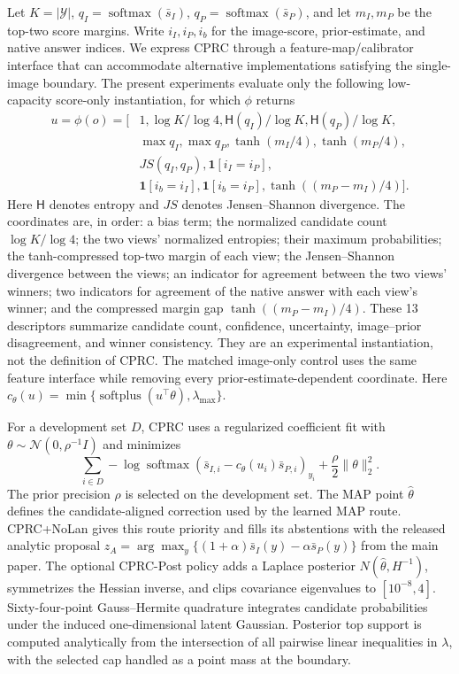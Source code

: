 \documentclass[letterpaper]{article}
\begin{document}
Let $K=|\mathcal Y|$, $q_I=\operatorname{softmax}(\bar s_I)$,
$q_P=\operatorname{softmax}(\bar s_P)$, and let $m_I,m_P$ be the top-two score
margins. Write $i_I,i_P,i_b$ for the image-score, prior-estimate, and native
answer indices. We express CPRC through a feature-map/calibrator interface that
can accommodate alternative implementations satisfying the single-image
boundary. The present experiments evaluate only the following low-capacity
score-only instantiation, for which $\phi$ returns
\begin{align}
u=\phi(o)=[&1,\log K/\log4,\mathsf H(q_I)/\log K,\mathsf H(q_P)/\log K,\nonumber\\
&\max q_I,\max q_P,\tanh(m_I/4),\tanh(m_P/4),\nonumber\\
&JS(q_I,q_P),\mathbf1[i_I=i_P],\nonumber\\
&\mathbf1[i_b=i_I],\mathbf1[i_b=i_P],
\tanh((m_P-m_I)/4)].
\end{align}
Here $\mathsf H$ denotes entropy and $JS$ denotes Jensen--Shannon divergence.
The coordinates are, in order: a bias term; the normalized candidate count
$\log K/\log 4$; the two views' normalized entropies; their maximum
probabilities; the tanh-compressed top-two margin of each view; the
Jensen--Shannon divergence between the views; an indicator for agreement
between the two views' winners; two indicators for agreement of the native
answer with each view's winner; and the compressed margin gap
$\tanh((m_P-m_I)/4)$. These 13 descriptors summarize candidate count, confidence, uncertainty,
image--prior disagreement, and winner consistency. They are an experimental
instantiation, not the definition of CPRC. The matched image-only control uses
the same feature interface while removing every prior-estimate-dependent coordinate.
Here
$c_\theta(u)=\min\{\operatorname{softplus}(u^\top\theta),\lambda_{\max}\}$.

For a development set $D$, CPRC uses a regularized coefficient fit with
$\theta\sim\mathcal N(0,\rho^{-1}I)$ and minimizes
\begin{equation}
\sum_{i\in D}-\log\operatorname{softmax}
  (\bar s_{I,i}-c_\theta(u_i)\bar s_{P,i})_{y_i}
  +\frac{\rho}{2}\|\theta\|_2^2.
\end{equation}
The prior precision $\rho$ is selected on the development set. The MAP point
$\hat\theta$ defines the candidate-aligned correction used by the learned MAP
route. CPRC+NoLan gives this route priority and fills its abstentions
with the released analytic proposal
$z_A=\arg\max_y\{(1+\alpha)\bar s_I(y)-\alpha\bar s_P(y)\}$ from the main
paper. The optional CPRC-Post policy adds a Laplace posterior
$N(\hat\theta,H^{-1})$, symmetrizes the Hessian
inverse, and clips covariance eigenvalues to $[10^{-8},4]$. Sixty-four-point
Gauss--Hermite quadrature integrates candidate probabilities under the induced
one-dimensional latent Gaussian. Posterior top support is computed analytically
from the intersection of all pairwise linear inequalities in $\lambda$, with
the selected cap handled as a point mass at the boundary.
\end{document}
